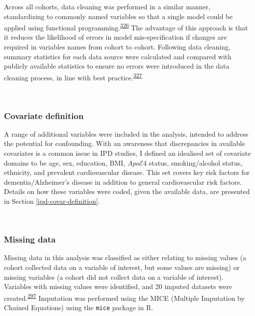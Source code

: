 \documentclass[a4paper, twoside]{templates/ociamthesis}
\begin{document}
Across all cohorts, data cleaning was performed in a similar manner, standardizing to commonly named variables so that a single model could be applied using functional programming.\textsuperscript{\protect\hyperlink{ref-wickham2016func}{326}} The advantage of this approach is that it reduces the likelihood of errors in model mis-specification if changes are required in variables names from cohort to cohort. Following data cleaning, summary statistics for each data source were calculated and compared with publicly available statistics to ensure no errors were introduced in the data cleaning process, in line with best practice.\textsuperscript{\protect\hyperlink{ref-levis2021}{327}}

~

\hypertarget{covariate-definition}{%
\subsubsection{Covariate definition}\label{covariate-definition}}

A range of additional variables were included in the analysis, intended to address the potential for confounding. With an awareness that discrepancies in available covariates is a common issue in IPD studies, I defined an idealised set of covariate domains to be age, sex, education, BMI, \emph{Apo}\(\mathcal{E}4\) status, smoking/alcohol status, ethnicity, and prevalent cardiovascular disease. This set covers key risk factors for dementia/Alzheimer's disease in addition to general cardiovascular risk factors. Details on how these variables were coded, given the available data, are presented in Section \ref{ipd-covar-definition}.

~

\hypertarget{missing-data-2}{%
\subsubsection{Missing data}\label{missing-data-2}}

Missing data in this analysis was classified as either relating to missing values (a cohort collected data on a variable of interest, but some values are missing) or missing variables (a cohort did not collect data on a variable of interest). Variables with missing values were identified, and 20 imputed datasets were created.\textsuperscript{\protect\hyperlink{ref-sterne2009}{297}} Imputation was performed using the MICE (Multiple Imputation by Chained Equations) using the \texttt{mice} package in R.
\end{document}
